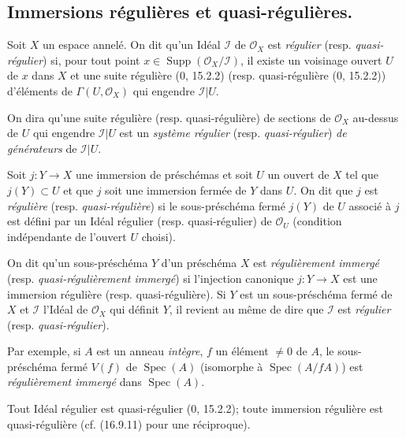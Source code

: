 \subsection{Immersions régulières et quasi-régulières.}
\label{IV.16.9}

\begin{definition}[16.9.1]
\label{IV.16.9.1}
Soit $X$ un espace annelé. On dit qu'un Idéal $\mathscr{I}$ de
$\mathcal{O}_X$ est \emph{régulier} (resp. \emph{quasi-régulier}) si, pour
tout point $x\in\operatorname{Supp}(\mathcal{O}_X/\mathscr{I})$, il existe un
voisinage ouvert $U$ de $x$ dans $X$ et une suite régulière (0, 15.2.2) (resp.
quasi-régulière (0, 15.2.2)) d'éléments de $\Gamma(U,\mathcal{O}_X)$ qui
engendre $\mathscr{I}|U$.
\end{definition}

On dira qu'une suite régulière (resp. quasi-régulière) de sections de
$\mathcal{O}_X$ au-dessus de $U$ qui engendre $\mathscr{I}|U$ est un
\emph{système régulier} (resp. \emph{quasi-régulier}) \emph{de générateurs}
de $\mathscr{I}|U$.

\begin{definition}[16.9.2]
\label{IV.16.9.2}
Soit $j:Y\to X$ une immersion de préschémas et soit $U$ un ouvert de $X$ tel
que $j(Y)\subset U$ et que $j$ soit une immersion fermée de $Y$ dans $U$. On
dit que $j$ est \emph{régulière} (resp. \emph{quasi-régulière}) si le
sous-préschéma fermé $j(Y)$ de $U$ associé à $j$ est défini par un Idéal
régulier (resp. quasi-régulier) de $\mathcal{O}_U$ (condition indépendante de
l'ouvert $U$ choisi).
\end{definition}

On dit qu'un sous-préschéma $Y$ d'un préschéma $X$ est \emph{régulièrement
immergé} (resp. \emph{quasi-régulièrement immergé}) si l'injection canonique
$j:Y\to X$ est une immersion régulière (resp. quasi-régulière). Si $Y$ est un
sous-préschéma fermé de $X$ et $\mathscr{I}$ l'Idéal de $\mathcal{O}_X$ qui
définit $Y$, il revient au même de dire que $\mathscr{I}$ est \emph{régulier}
(resp. \emph{quasi-régulier}).

Par exemple, si $A$ est un anneau \emph{intègre}, $f$ un élément $\neq0$ de
$A$, le sous-préschéma fermé $V(f)$ de $\operatorname{Spec}(A)$ (isomorphe à
$\operatorname{Spec}(A/fA)$) est \emph{régulièrement immergé} dans
$\operatorname{Spec}(A)$.

Tout Idéal régulier est quasi-régulier (0, 15.2.2); toute immersion régulière
est quasi-régulière (cf. (16.9.11) pour une réciproque).

